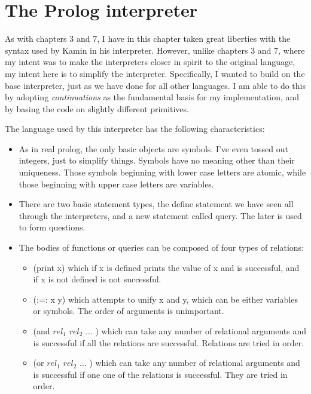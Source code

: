 \chapter{The Prolog interpreter}

As with chapters 3 and 7, I have in this chapter taken great liberties with
the syntax used by Kamin in his interpreter.  However, unlike chapters 3 and 7,
where my intent was to make the interpreters closer in spirit to the
original language, my intent here is to simplify the interpreter.
Specifically, I wanted to build on the base interpreter, just as we have done
for all other languages.  I am able to do this by adopting {\em continuations}
as the fundamental basis for my implementation, and by basing the code on
slightly different primitives.

The language used by this interpreter has the following characteristics:
\begin{itemize}
\item
As in real prolog, the only basic objects are symbols.
I've even tossed out integers, just to simplify things.
Symbols have no meaning other than their uniqueness.
Those symbols beginning with lower case letters are atomic, while those
beginning with upper case letters are variables.
\item
There are two basic statement types, the {\sf define} statement we
have seen all through the interpreters, and a new statement called 
{\sf query}.   The later is used to form questions.
\item
The bodies of functions or queries can be composed of four types of
relations:
\begin{itemize}
\item
{\sf (print x)} which if x is defined prints the value of x and is successful,
and if x is not defined is not successful.
\item
{\sf (:=: x y)} which attempts to unify x and y, which can be either 
variables or symbols.  The order of arguments is unimportant.
\item
{\sf (and $rel_1$ $rel_2$ ... )} which can take any number of 
relational arguments and is successful if all the relations are successful.  
Relations are tried in order.
\item
{\sf (or $rel_1$ $rel_2$ ... )} which can take any number of relational 
arguments and is successful if one one of the relations is successful.  
They are tried in order.
\end{itemize}
\end{itemize}

